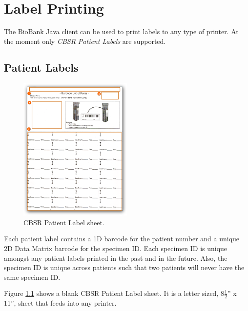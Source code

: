 \chapter{Label Printing}
\label{chap:printer_labels}

The BioBank Java client can be used to print labels to any type of printer. At
the moment only \emph{CBSR Patient Labels} are supported.

\section{Patient Labels}
\label{sec:printer_labels}

\begin{figure}
  \vspace{-20pt}
  \begin{center}
    \includegraphics[width=0.5\textwidth]{screenshots/printer_labels/01_cbsr_patient_label_sheet}
  \end{center}
  \caption{CBSR Patient Label sheet.}
  \label{fig:cbsr_patient_label_sheet}
  \vspace{-15pt}
\end{figure}

Each patient label contains a 1D barcode for the patient number and a unique 2D
Data Matrix barcode for the specimen ID. Each specimen ID is unique amongst any
patient labels printed in the past and in the future. Also, the specimen ID is
unique across patients such that two patients will never have the same specimen
ID.

Figure \ref{fig:cbsr_patient_label_sheet} shows a blank CBSR Patient Label
sheet. It is a letter sized, 8$\frac{1}{2}$'' x 11'', sheet that
feeds into any printer.

